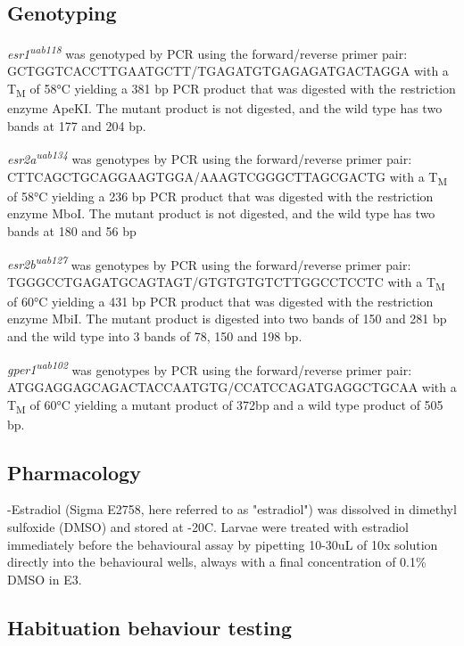 \documentclass[9.5pt,lineno]{RandlettLab_elife}
\begin{document}
{\subsection{Genotyping}

\emph{esr1\textsuperscript{uab118}} was genotyped by PCR using the forward/reverse primer pair:
\\ \mbox{GCTGGTCACCTTGAATGCTT/TGAGATGTGAGAGATGACTAGGA} with a T\textsubscript{M} of 58°C yielding a 381 bp PCR product that was digested with the restriction enzyme ApeKI. 
The mutant product is not digested, and the wild type has two bands at 177 and 204 bp.

\emph{esr2a\textsuperscript{uab134}} was genotypes by PCR using the forward/reverse primer pair:
\\ \mbox{CTTCAGCTGCAGGAAGTGGA/AAAGTCGGGCTTAGCGACTG} with a T\textsubscript{M} of 58°C yielding a 236 bp PCR product that was digested with the restriction enzyme MboI.
The mutant product is not digested, and the wild type has two bands at 180 and 56 bp 

\emph{esr2b\textsuperscript{uab127}} was genotypes by PCR using the forward/reverse primer pair:
\\ \mbox{TGGGCCTGAGATGCAGTAGT/GTGTGTGTCTTGGCCTCCTC} with a T\textsubscript{M} of 60°C yielding a 431 bp PCR product that was digested with the restriction enzyme MbiI.
The mutant product is digested into two bands of 150 and 281 bp and the wild type into 3 bands of 78, 150 and 198 bp. 

\emph{gper1\textsuperscript{uab102}} was genotypes by PCR using the forward/reverse primer pair:
\\ \mbox{ATGGAGGAGCAGACTACCAATGTG/CCATCCAGATGAGGCTGCAA} with a T\textsubscript{M} of 60°C yielding a mutant product of 372bp and a wild type product of 505 bp.


\subsection{Pharmacology}

\textbeta-Estradiol (Sigma E2758, here referred to as "estradiol") was dissolved in dimethyl sulfoxide (DMSO) and stored at -20\degree C. 
Larvae were treated with estradiol immediately before the behavioural assay by pipetting 10-30uL of 10x solution directly into the behavioural wells, always with a final concentration of 0.1\% DMSO in E3.

\subsection{Habituation behaviour testing}

}
\end{document}
